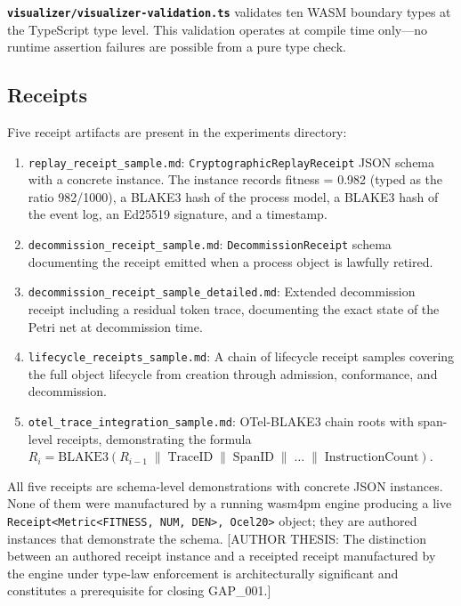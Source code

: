 \textbf{\texttt{visualizer/visualizer-validation.ts}} validates ten WASM boundary
types at the TypeScript type level. This validation operates at compile time only---no
runtime assertion failures are possible from a pure type check.

\subsection{Receipts}
\label{sec:experiments-core-evidence-receipts}

Five receipt artifacts are present in the experiments directory:

\begin{enumerate}
  \item \texttt{replay\_receipt\_sample.md}: \texttt{CryptographicReplayReceipt}
    JSON schema with a concrete instance. The instance records fitness = 0.982
    (typed as the ratio 982/1000), a BLAKE3 hash of the process model, a BLAKE3
    hash of the event log, an Ed25519 signature, and a timestamp.
  \item \texttt{decommission\_receipt\_sample.md}: \texttt{DecommissionReceipt}
    schema documenting the receipt emitted when a process object is lawfully retired.
  \item \texttt{decommission\_receipt\_sample\_detailed.md}: Extended decommission
    receipt including a residual token trace, documenting the exact state of the
    Petri net at decommission time.
  \item \texttt{lifecycle\_receipts\_sample.md}: A chain of lifecycle receipt
    samples covering the full object lifecycle from creation through admission,
    conformance, and decommission.
  \item \texttt{otel\_trace\_integration\_sample.md}: OTel-BLAKE3 chain roots
    with span-level receipts, demonstrating the formula
    $R_i = \mathrm{BLAKE3}(R_{i-1} \;\|\; \mathrm{TraceID} \;\|\; \mathrm{SpanID} \;\|\; \ldots \;\|\; \mathrm{InstructionCount})$.
\end{enumerate}

All five receipts are schema-level demonstrations with concrete JSON instances.
None of them were manufactured by a running wasm4pm engine producing a live
\texttt{Receipt<Metric<FITNESS, NUM, DEN>, Ocel20>} object; they are authored
instances that demonstrate the schema. [AUTHOR THESIS: The distinction between
an authored receipt instance and a receipted receipt manufactured by the engine
under type-law enforcement is architecturally significant and constitutes a
prerequisite for closing GAP\_001.]

